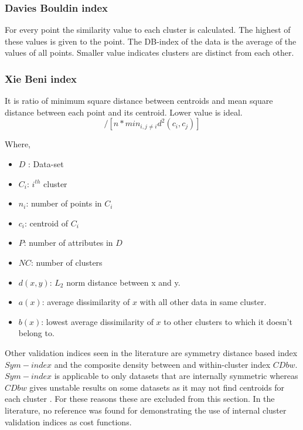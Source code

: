 \documentclass{svproc}
\begin{document}
\subsubsection{Davies Bouldin index \cite{ppr:1} \cite{ppr:11}}
For every point the similarity value to each cluster is calculated. The highest of these values is given to the point. The DB-index of the data is the average of the values of all points. Smaller value indicates clusters are distinct from each other.

\subsubsection{Xie Beni index \cite{ppr:1} \cite{ppr:11}}
It is ratio of minimum square distance between centroids and mean square distance between
each point and its centroid. Lower value is ideal.
\begin{equation}
[\sum_i \sum_{x \in C_i} d^2(x, c_i)] / [n * min_{i,j \ne i} d^2(c_i, c_j)]
\end{equation}

Where,
\begin{itemize}
\item $D$ : Data-set
\item $C_i$: $i^{th}$ cluster
\item $n_i$: number of points in $C_i$
\item $c_i$: centroid of $C_i$
\item $P$: number of attributes in $D$
\item $NC$: number of clusters
\item $d(x,y)$: $L_2$ norm distance between x and y.
\item $a(x)$: average dissimilarity of $x$ with all other data in same cluster.
\item $b(x)$: lowest average dissimilarity of $x$ to other clusters to which it doesn't belong to. 
\end{itemize}

Other validation indices seen in the literature are symmetry distance based index $Sym-index$ and the composite density between and within-cluster index $CDbw$. $Sym-index$ is applicable to only datasets that are internally symmetric whereas $CDbw$ gives unstable results on some datasets as it may not find centroids for each cluster \cite{ppr:11}. For these reasons these are excluded from this section.  In the literature, no reference was found for demonstrating the use of internal cluster validation indices as cost functions. 
\end{document}
